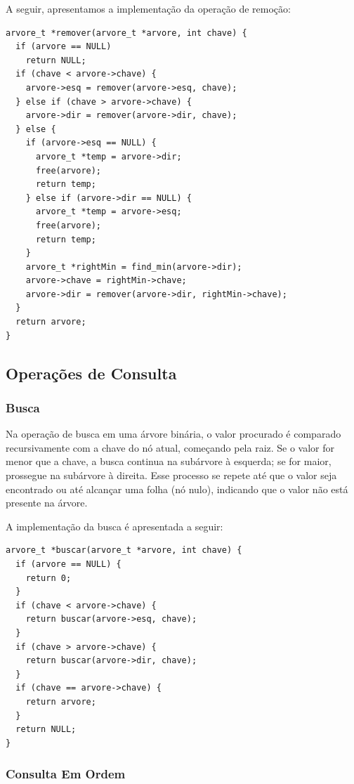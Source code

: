 A seguir, apresentamos a implementação da operação de remoção:

\vspace{3mm}

\begin{lstlisting}
arvore_t *remover(arvore_t *arvore, int chave) {
  if (arvore == NULL)
    return NULL;
  if (chave < arvore->chave) {
    arvore->esq = remover(arvore->esq, chave);
  } else if (chave > arvore->chave) {
    arvore->dir = remover(arvore->dir, chave);
  } else {
    if (arvore->esq == NULL) {
      arvore_t *temp = arvore->dir;
      free(arvore);
      return temp;
    } else if (arvore->dir == NULL) {
      arvore_t *temp = arvore->esq;
      free(arvore);
      return temp;
    }
    arvore_t *rightMin = find_min(arvore->dir);
    arvore->chave = rightMin->chave;
    arvore->dir = remover(arvore->dir, rightMin->chave);
  }
  return arvore;
}
\end{lstlisting}

\subsection{Operações de Consulta}

\subsubsection{Busca}

Na operação de busca em uma árvore binária, o valor procurado é comparado recursivamente com a chave do nó atual, começando pela raiz. Se o valor for menor que a chave, a busca continua na subárvore à esquerda; se for maior, prossegue na subárvore à direita. Esse processo se repete até que o valor seja encontrado ou até alcançar uma folha (nó nulo), indicando que o valor não está presente na árvore.

A implementação da busca é apresentada a seguir:

\vspace{3mm}

\begin{lstlisting}
arvore_t *buscar(arvore_t *arvore, int chave) {
  if (arvore == NULL) {
    return 0;
  }
  if (chave < arvore->chave) {
    return buscar(arvore->esq, chave);
  }
  if (chave > arvore->chave) {
    return buscar(arvore->dir, chave);
  }
  if (chave == arvore->chave) {
    return arvore;
  }
  return NULL;
}
\end{lstlisting}

\subsubsection{Consulta Em Ordem}

